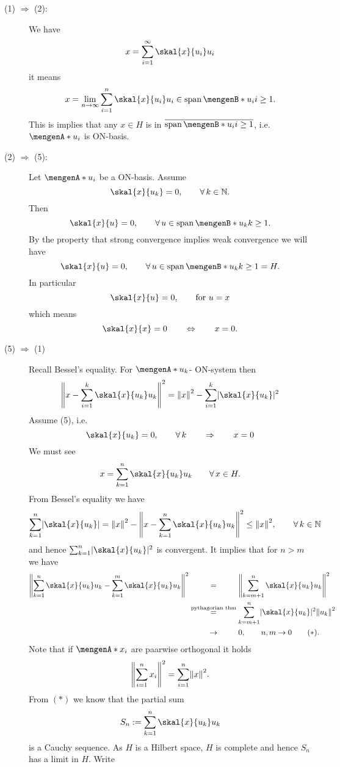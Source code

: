 \begin{beweis}
 	\begin{description}
 		\item[(1) $\Rightarrow $ (2):] We have 
		\[
			x = \sum^{\infty}_{i=1} \skal{x}{u_i}u_i
		\] 
		it means
		\[
			x = \lim_{n \to \infty} \sum^{n}_{i=1} \skal{x}{u_i}u_i \in \spn\set[u_i]{i \geq 1}.
		\]
		This is implies that any $x \in H$ is in $\overline{\spn \set[u_i]{i \geq 1}}$, i.e. $\set{u_i}$ is ON-basis.
		\item[(2) $\Rightarrow$ (5):] Let $\set{u_i}$ be a ON-basis. Assume 
		\[
			\skal{x}{u_k} = 0, \qquad \forall\,  k \in \mathbb{N}.
		\]
		Then
		\[
			\skal{x}{u} = 0, \qquad \forall\, u \in \spn\set[u_k]{k \geq 1}.
		\]
		By the property that strong convergence implies weak convergence we will have 
		\[
			\skal{x}{u}= 0, \qquad \forall\, u \in \spn\set[u_k]{k \geq 1} = H.
		\]
		In particular
		\[
			\skal{x}{u} = 0, \qquad \text{for }u =x
		\]
		which means
		\[
			\skal{x}{x} = 0 \qquad \Leftrightarrow \qquad  x=0.
		\]
		\item[(5) $\Rightarrow$ (1)] Recall Bessel's equality. For $\set{u_k}$- ON-system then 
		\[
			\norm{x- \sum^{k}_{i=1} \skal{x}{u_k}u_k}^2 = \norm{x}^2 - \sum^{k}_{i=1} \abs{\skal{x}{u_k}}^2
		\]
		Assume (5), i.e.
		\[
			\skal{x}{u_k} = 0, \qquad \forall\, k \qquad \Rightarrow \qquad x = 0
		\]
		We must see
		\[
			x = \sum_{k=1}^{n} \skal{x}{u_k}u_k \qquad \forall\, x \in H.
		\]
		From Bessel's equality we have
		\[
			\sum_{k=1}^{n} \abs{\skal{x}{u_k}} = \norm{x}^2 - \norm{x- \sum_{k=1}^{n} \skal{x}{u_k}u_k}^2 \leq \norm{x}^2, \qquad \forall\, k \in \mathbb{N}
		\]
		and hence $\sum_{k=1}^{n}\abs{\skal{x}{u_k}}^2$ is convergent. It implies that for $n>m$ we have
		\begin{align*}
			\norm{\sum_{k=1}^{n}\skal{x}{u_k}u_k - \sum_{k=1}^{m} \skal{x}{u_k}u_k}^2 
			&\stackrel{\hphantom{\text{pythagorian thm}}}{=} \norm{\sum_{k=m+1}^{n} \skal{x}{u_k}u_k}^2 \\
			&\stackrel{\text{pythagorian thm}}{=} \sum_{k=m+1}^{n} \abs{\skal{x}{u_k}}^2 \norm{u_k}^2 \\
			&\stackrel{\hphantom{\text{pythagorian thm}}}{\to } 0, \qquad n,m \to 0 \qquad (*).
		\end{align*}
		Note that if $\set{x_i}$ are paarwise orthogonal it holds
		\[
			\norm{\sum^{n}_{i=1}x_i}^2 = \sum^{n}_{i=1} \norm{x}^2.
		\]
		From $(*)$ we know that the partial sum
		\[
			S_n := \sum_{k=1}^{n}\skal{x}{u_k}u_k
		\]
		is a Cauchy sequence. As $H$ is a Hilbert space, $H$ is complete and hence $S_n$ has a limit in $H$. Write

\end{description}
\end{beweis}
